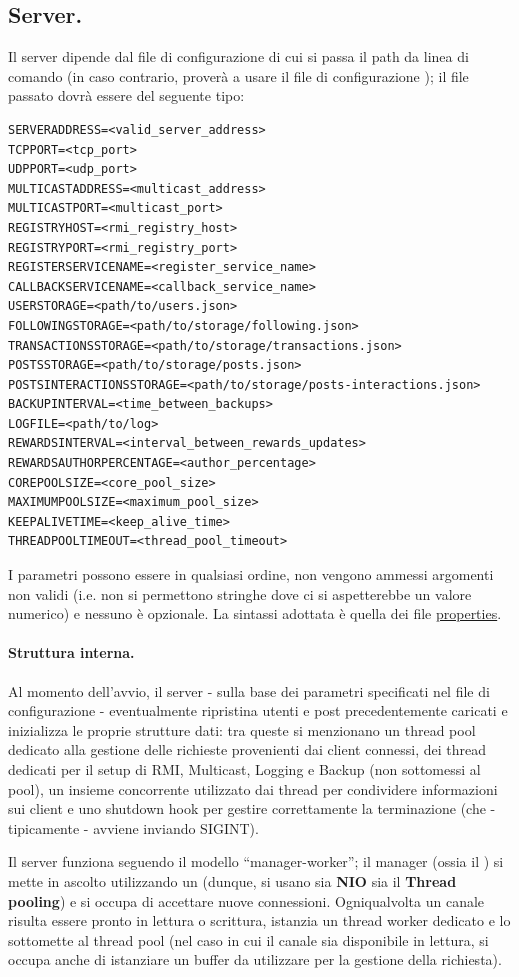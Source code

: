 \documentclass[11pt, italian, openany]{book}
\begin{document}
\begin{sloppypar}
\subsection{Server.}
Il server dipende dal file di configurazione di cui si passa il path da linea di comando (in caso
contrario, prover\`a a usare il file di configurazione );
il file passato dovr\`a essere del seguente tipo:
\begin{lstlisting}[style=code]
SERVERADDRESS=<valid_server_address>
TCPPORT=<tcp_port>
UDPPORT=<udp_port>
MULTICASTADDRESS=<multicast_address>
MULTICASTPORT=<multicast_port>
REGISTRYHOST=<rmi_registry_host>
REGISTRYPORT=<rmi_registry_port>
REGISTERSERVICENAME=<register_service_name>
CALLBACKSERVICENAME=<callback_service_name>
USERSTORAGE=<path/to/users.json>
FOLLOWINGSTORAGE=<path/to/storage/following.json>
TRANSACTIONSSTORAGE=<path/to/storage/transactions.json>
POSTSSTORAGE=<path/to/storage/posts.json>
POSTSINTERACTIONSSTORAGE=<path/to/storage/posts-interactions.json>
BACKUPINTERVAL=<time_between_backups>
LOGFILE=<path/to/log>
REWARDSINTERVAL=<interval_between_rewards_updates>
REWARDSAUTHORPERCENTAGE=<author_percentage>
COREPOOLSIZE=<core_pool_size>
MAXIMUMPOOLSIZE=<maximum_pool_size>
KEEPALIVETIME=<keep_alive_time>
THREADPOOLTIMEOUT=<thread_pool_timeout>
\end{lstlisting}
I parametri possono essere in qualsiasi ordine, non vengono ammessi argomenti non validi (i.e. non si permettono
stringhe dove ci si aspetterebbe un valore numerico) e nessuno \`e opzionale. La sintassi adottata \`e quella dei file
\href{https://en.wikipedia.org/wiki/.properties}{properties}.

\paragraph*{Struttura interna.}
Al momento dell'avvio, il server - sulla base dei parametri specificati nel file di configurazione - eventualmente ripristina utenti e post
precedentemente caricati e inizializza le proprie strutture dati: tra queste si menzionano un thread pool dedicato alla gestione delle
richieste provenienti dai client connessi, dei thread dedicati per il setup di RMI, Multicast, Logging e Backup
(non sottomessi al pool), un insieme concorrente utilizzato dai thread per condividere informazioni sui client e uno shutdown hook per
gestire correttamente la terminazione (che - tipicamente - avviene inviando SIGINT).

Il server funziona seguendo il modello ``manager-worker''; il manager (ossia il ) si mette in ascolto utilizzando un 
(dunque, si usano sia \textbf{NIO} sia il \textbf{Thread pooling}) e si occupa di accettare nuove connessioni. Ogniqualvolta un canale
risulta essere pronto in lettura o scrittura, istanzia un thread worker dedicato e lo sottomette al thread pool (nel caso in cui il canale
sia disponibile in lettura, si occupa anche di istanziare un buffer da utilizzare per la gestione della richiesta).


\end{sloppypar}
\end{document}
